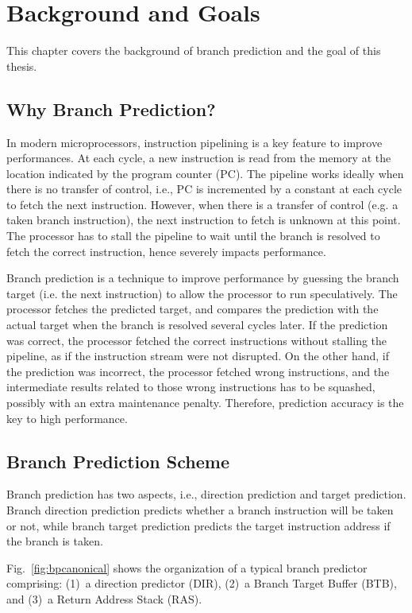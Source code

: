 \chapter{Background and Goals}
This chapter covers the background of branch prediction and the goal of this thesis. 

\section{Why Branch Prediction?}
\label{sec:background:whybp}
In modern microprocessors, instruction pipelining is a key feature to improve performances. At each cycle, a new instruction is read from the memory at the location indicated by the program counter (PC). The pipeline works ideally when there is no transfer of control, i.e., PC is incremented by a constant at each cycle to fetch the next instruction. However, when there is a transfer of control (e.g. a taken branch instruction), the next instruction to fetch is unknown at this point. The processor has to stall the pipeline to wait until the branch is resolved to fetch the correct instruction, hence severely impacts performance.

Branch prediction is a technique to improve performance by guessing the branch target (i.e. the next instruction) to allow the processor to run speculatively. The processor fetches the predicted target, and compares the prediction with the actual target when the branch is resolved several cycles later. If the prediction was correct, the processor fetched the correct instructions without stalling the pipeline, as if the instruction stream were not disrupted. On the other hand, if the prediction was incorrect, the processor fetched wrong instructions, and the intermediate results related to those wrong instructions has to be squashed, possibly with an extra maintenance penalty. Therefore, prediction accuracy is the key to high performance.

\section{Branch Prediction Scheme}
\label{sec:background:bpscheme}
Branch prediction has two aspects, i.e., direction prediction and target prediction. Branch direction prediction predicts whether a branch instruction will be taken or not, while branch target prediction predicts the target instruction address if the branch is taken.

Fig.~\ref{fig:bpcanonical} shows the organization of a typical branch predictor comprising: (1)~a direction predictor (DIR), (2)~a Branch Target Buffer (BTB), and (3)~a Return Address Stack (RAS).  

